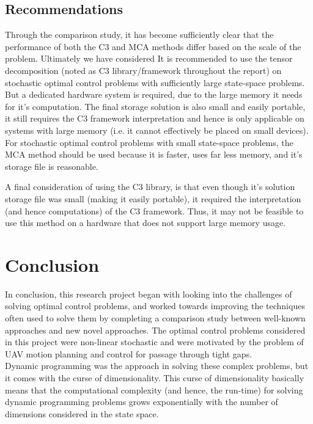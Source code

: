 \documentclass[11pt,draftd]{article}
\begin{document}
\subsection{Recommendations}
Through the comparison study, it has become sufficiently clear that the performance of both the C3 and MCA methods differ based on the scale of the problem. Ultimately we have considered
It is recommended to use the tensor decomposition (noted as C3 library/framework throughout the report) on stochastic optimal control problems with sufficiently large state-space problems. But a dedicated hardware system is required, due to the large memory it needs for it's computation. The final storage solution is also small and easily portable, it still requires the C3 framework interpretation and hence is only applicable on systems with large memory (i.e. it cannot effectively be placed on small devices). For stochastic optimal control problems with small state-space problems, the MCA method should be used because it is faster, uses far less memory, and it's storage file is reasonable.

A final consideration of using the C3 library, is that even though it's solution storage file was small (making it easily portable), it required the interpretation (and hence computations) of the C3 framework. Thus, it may not be feasible to use this method on a hardware that does not support large memory usage.

\newpage 

\section{Conclusion}
In conclusion, this research project began with looking into the challenges of solving optimal control problems, and worked towards improving the techniques often used to solve them by completing a comparison study between well-known approaches and new novel approaches. The optimal control problems considered in this project were non-linear stochastic and were motivated by the problem of UAV motion planning and control for passage through tight gaps. \\

Dynamic programming was the approach in solving these complex problems, but it comes with the curse of dimensionality. This curse of dimensionality basically means that the computational complexity (and hence, the run-time) for solving dynamic programming problems grows exponentially with the number of dimensions considered in the state space. \\
\end{document}
